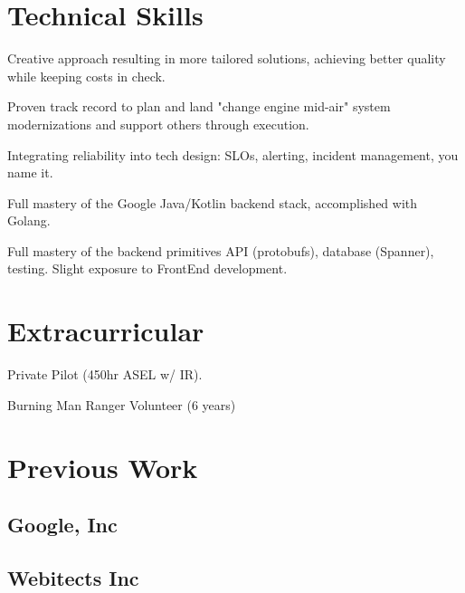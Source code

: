 \documentclass{resume}
\newcommand{\textapprox}{\raisebox{0.5ex}{\texttildelow}}
\begin{document}
\section{Technical Skills}
\begin{compactitem}
  \item Creative approach resulting in more tailored solutions, achieving better quality while keeping costs in check.
  \item Proven track record to plan and land "change engine mid-air" system modernizations and support others through execution.
  \item Integrating reliability into tech design: SLOs, alerting, incident management, you name it.
  \item Full mastery of the Google Java/Kotlin backend stack, accomplished with Golang.
  \item Full mastery of the backend primitives API (protobufs), database (Spanner), testing. Slight exposure to FrontEnd development.
\end{compactitem}

\section{Extracurricular}
\begin{compactitem}
  \item Private Pilot (\textapprox 450hr ASEL w/ IR).
  \item Burning Man Ranger Volunteer (6 years)
\end{compactitem}

\section{Previous Work}

\subsection{Google, Inc}


\subsection{Webitects Inc}
\end{document}

